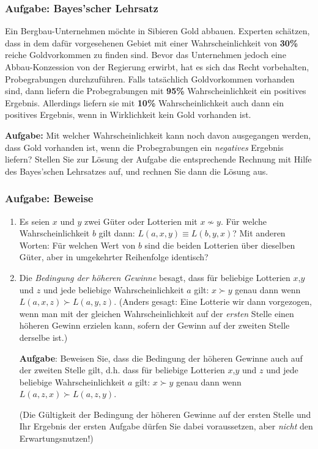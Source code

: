 \subsubsection*{Aufgabe: Bayes'scher Lehrsatz}

Ein Bergbau-Unternehmen möchte in Sibieren Gold abbauen. Experten schätzen,
dass in dem dafür vorgesehenen Gebiet mit einer Wahrscheinlichkeit von {\bf
30\%} reiche Goldvorkommen zu finden sind. Bevor das Unternehmen jedoch eine
Abbau-Konzession von der Regierung erwirbt, hat es sich das Recht vorbehalten,
Probegrabungen durchzuführen. Falls tatsächlich Goldvorkommen vorhanden
sind, dann liefern die Probegrabungen mit {\bf 95\%} Wahrscheinlichkeit 
ein positives Ergebnis. Allerdings liefern sie mit {\bf 10\%}
Wahrscheinlichkeit auch dann ein positives Ergebnis, wenn in Wirklichkeit kein
Gold vorhanden ist.

\vspace{0.2em}

\setlength{\parindent}{0em}
{\bf Aufgabe:} Mit welcher Wahrscheinlichkeit kann noch davon ausgegangen
werden, dass Gold vorhanden ist, wenn die Probegrabungen ein {\em negatives}
Ergebnis liefern? Stellen Sie zur Lösung der Aufgabe die
entsprechende Rechnung mit Hilfe des Bayes'schen Lehrsatzes auf, und 
rechnen Sie dann die Lösung aus.

\subsubsection*{Aufgabe: Beweise}

\begin{enumerate}
  \item Es seien $x$ und $y$ zwei Güter oder Lotterien mit $x \not\sim y$. Für
  welche Wahrscheinlichkeit $b$ gilt dann: $L(a, x, y) \equiv L(b, y, x)$? Mit
  anderen Worten: Für welchen Wert von $b$ sind die beiden Lotterien über dieselben
  Güter, aber in umgekehrter Reihenfolge identisch?

  \item Die {\em Bedingung der höheren Gewinne} besagt, dass für beliebige
  Lotterien $x$,$y$ und $z$ und jede beliebige Wahrscheinlichkeit $a$ 
  gilt: $x \succ y$ genau dann wenn $L(a, x, z) \succ L(a, y, z)$. 
  (Anders gesagt: Eine Lotterie wir dann vorgezogen, wenn man mit der gleichen 
  Wahrscheinlichkeit auf der {\em ersten} Stelle einen höheren Gewinn erzielen 
  kann, sofern der Gewinn auf der zweiten Stelle derselbe ist.)
  
  {\bf Aufgabe}: Beweisen Sie, dass die Bedingung der höheren Gewinne auch auf der zweiten 
  Stelle gilt, d.h. dass für beliebige Lotterien $x$,$y$
  und $z$ und jede beliebige Wahrscheinlichkeit $a$ gilt: $x \succ y$ genau
  dann wenn $L(a, z, x) \succ L(a, z, y)$.
  
  (Die Gültigkeit der Bedingung der höheren Gewinne auf der ersten Stelle 
   und Ihr Ergebnis der ersten Aufgabe dürfen Sie dabei voraussetzen, aber {\em nicht} den Erwartungsnutzen!)     
\end{enumerate}


